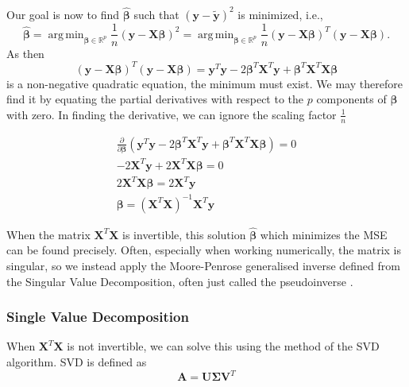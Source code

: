 \documentclass{article}
\DeclareMathOperator*{\argmin}{arg\,min}
\begin{document}
Our goal is now to find $\boldsymbol{\hat{\beta}}$ such that $\left( \boldsymbol{y} - \boldsymbol{\tilde{y}} \right)^2$ is minimized, i.e.,
\begin{equation*}
    \boldsymbol{\hat{\beta}}  = \argmin_{\boldsymbol{\beta} \in \mathbb{R}^p} \frac{1}{n} \left( \boldsymbol{y} - \boldsymbol{X\beta} \right)^2 = \argmin_{\boldsymbol{\beta} \in \mathbb{R}^p} \frac{1}{n} \left( \boldsymbol{y} - \boldsymbol{X\beta} \right)^T \left( \boldsymbol{y} - \boldsymbol{X\beta} \right).
\end{equation*}
As then
\begin{equation*}
    \left( \boldsymbol{y} - \boldsymbol{X\beta} \right)^T \left( \boldsymbol{y} - \boldsymbol{X\beta} \right) = \boldsymbol{y}^T \boldsymbol{y} - 2 \boldsymbol{\beta}^T \boldsymbol{X}^T \boldsymbol{y} + \boldsymbol{\beta}^T \boldsymbol{X}^T \boldsymbol{X} \boldsymbol{\beta} 
\end{equation*}
is a non-negative quadratic equation, the minimum must exist. We may therefore find it by equating the partial derivatives with respect to the $p$ components of $\boldsymbol{\beta}$ with zero. In finding the derivative, we can ignore the scaling factor $\frac{1}{n}$

\begin{gather*}
    \frac{\partial}{\partial \boldsymbol{\beta}} \left( \boldsymbol{y}^T \boldsymbol{y} - 2 \boldsymbol{\beta}^T \boldsymbol{X}^T \boldsymbol{y} + \boldsymbol{\beta}^T \boldsymbol{X}^T \boldsymbol{X} \boldsymbol{\beta} \right) = 0 \\
    -2 \boldsymbol{X}^T \boldsymbol{y} + 2 \boldsymbol{X}^T \boldsymbol{X \beta} = 0 \\
    2 \boldsymbol{X}^T \boldsymbol{X \beta} = 2 \boldsymbol{X}^T \boldsymbol{y} \\
    \boldsymbol{\beta} = \left( \boldsymbol{X}^T \boldsymbol{X} \right)^{-1} \boldsymbol{X}^T \boldsymbol{y}
\end{gather*}

When the matrix $\boldsymbol{X}^T \boldsymbol{X}$ is invertible, this solution $\boldsymbol{\hat{\beta}}$ which minimizes the MSE can be found precisely. Often, especially when working numerically, the matrix is singular, so we instead apply the Moore-Penrose generalised inverse defined from the Singular Value Decomposition, often just called the pseudoinverse \cite{introNumeric}.


\subsubsection{Single Value Decomposition}
When $\mathbf{X}^T\mathbf{X}$ is not invertible, we can solve this using the method of the SVD algorithm. SVD is defined as
\begin{equation*}
    \mathbf{A} = \mathbf{U}\mathbf{\Sigma}\mathbf{V}^T
\end{equation*}
\end{document}
